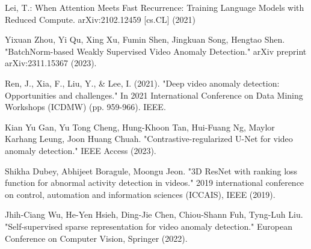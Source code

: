 \begin{thebibliography}{99}
Lei, T.: When Attention Meets Fast Recurrence: Training Language Models with Reduced Compute. arXiv:2102.12459 [cs.CL] (2021)

Yixuan Zhou, Yi Qu, Xing Xu, Fumin Shen, Jingkuan Song, Hengtao Shen. "BatchNorm-based Weakly Supervised Video Anomaly Detection." arXiv preprint arXiv:2311.15367 (2023).

Ren, J., Xia, F., Liu, Y., \& Lee, I. (2021). "Deep video anomaly detection: Opportunities and challenges." In 2021 International Conference on Data Mining Workshops (ICDMW) (pp. 959-966). IEEE.

Kian Yu Gan, Yu Tong Cheng, Hung-Khoon Tan, Hui-Fuang Ng, Maylor Karhang Leung, Joon Huang Chuah. "Contrastive-regularized U-Net for video anomaly detection." IEEE Access (2023).

Shikha Dubey, Abhijeet Boragule, Moongu Jeon. "3D ResNet with ranking loss function for abnormal activity detection in videos." 2019 international conference on control, automation and information sciences (ICCAIS), IEEE (2019).

Jhih-Ciang Wu, He-Yen Hsieh, Ding-Jie Chen, Chiou-Shann Fuh, Tyng-Luh Liu. "Self-supervised sparse representation for video anomaly detection." European Conference on Computer Vision, Springer (2022).


\end{thebibliography}


